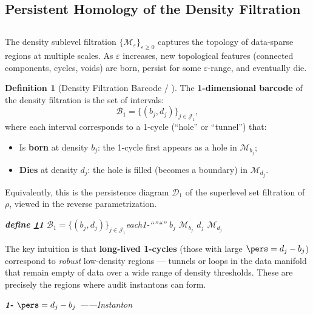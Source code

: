 \documentclass[11pt,a4paper]{article}
\theoremstyle{plain}
\theoremstyle{definition}
\newtheorem{definition}[theorem]{Definition}
\newcommand{\cM}{\mathcal{M}}
\newcommand{\cD}{\mathcal{D}}
\newcommand{\cB}{\mathcal{B}}
\begin{document}
\subsection{Persistent Homology of the Density Filtration}
\subsection*{}

The density sublevel filtration $\{\cM_{\varepsilon}\}_{\varepsilon \geq 0}$ 
captures the topology of data-sparse regions at multiple scales. As $\varepsilon$ 
increases, new topological features (connected components, cycles, voids) are 
born, persist for some $\varepsilon$-range, and eventually die.

\begin{definition}[Density Filtration Barcode / ]
\label{def:barcode}
The \textbf{1-dimensional barcode} of the density filtration is the set of 
intervals:
\begin{equation}
  \cB_1 = \{(b_j, d_j)\}_{j \in \mathcal{J}_1},
  \label{eq:barcode}
\end{equation}
where each interval corresponds to a 1-cycle (``hole'' or ``tunnel'') that:
\begin{itemize}
  \item Is \textbf{born} at density $b_j$: the 1-cycle first appears as a 
        hole in $\cM_{b_j}$;
  \item \textbf{Dies} at density $d_j$: the hole is filled (becomes a 
        boundary) in $\cM_{d_j}$.
\end{itemize}
Equivalently, this is the persistence diagram $\cD_1$ of the superlevel 
set filtration of $\rho$, viewed in the reverse parametrization.
\end{definition}

\bigskip
\noindent
\textit{\textbf{define \ref{def:barcode}}\textbf{1} $\cB_1 = \{(b_j, d_j)\}_{j \in \mathcal{J}_1}$each1-``''``'' $b_j$ \textbf{}$\cM_{b_j}$  $d_j$ \textbf{}$\cM_{d_j}$ }

The key intuition is that \textbf{long-lived 1-cycles} (those with large 
$\pers = d_j - b_j$) correspond to \emph{robust} low-density 
regions — tunnels or loops in the data manifold that remain empty of 
data over a wide range of density thresholds. These are precisely the 
regions where audit instantons can form.

\bigskip
\noindent
\textit{\textbf{1-} $\pers = d_j - b_j$ \textbf{}——Instanton}

\end{document}
